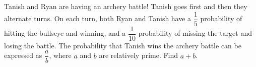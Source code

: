 Tanish and Ryan are having an archery battle! Tanish goes first and then they alternate turns. On each turn, both Ryan and Tanish have a $\dfrac{1}{5}$ probability of hitting the bullseye and winning, and a $\dfrac{1}{10}$ probability of missing the target and losing the battle. The probability that Tanish wins the archery battle can be expressed as $\dfrac{a}{b}$, where $a$ and $b$ are relatively prime. Find $a + b$.
